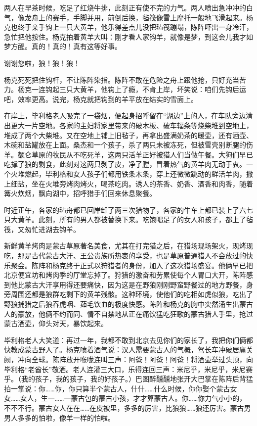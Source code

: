 \par 两人在早茶时候，吃足了红烧牛排，此刻正有使不完的力气。两人喷出急冲冲的白气，像龙舟上的赛手，手脚并用，前倒后换，毡筏像雪上摩托一般地飞滑起来。杨克也终于亲手钩上一只大黄羊，他乐得差点儿没把毡筏蹦塌，陈阵吓出一身冷汗，急忙把他按住。杨克拍着黄羊大叫：刚才看人家钩羊，就像是梦，到这会儿我才如梦方醒。真的！真的！真有这等好事。
\par 谢谢您啦，狼！狼！狼！
\par 杨克死死把住钩杆，不让陈阵染指。陈阵不敢在危险之舟上跟他抢，只好充当苦力。杨克一连钩起三只大黄羊，他钩上了瘾，不肯上岸，坏笑说：咱们先钩后运吧，效率更高。说完，杨克就把钩到的羊平放在结实的雪面上。
\par 在岸上，毕利格老人吸完了一袋烟，便起身招呼留在“湖边”上的人，在车队旁边清出更大一片空地。各家的主妇将家里带来的破木板、破车辐条等烧柴堆到空地上，堆成了两个大柴堆。又在空地上铺上旧毡子，再拿出盛满奶茶的暖壶，还有酒壶、木碗和盐罐放在上面。桑杰和一个孩子，杀了两只未被冻死，但被雪壳别断腿的伤羊。额仑草原的牧民从不吃死羊，这两只活羊正好被猎人们当做午餐。大狗们早已吃撑了狼的剩食，此刻对这两只剥了皮，净了膛，冒着热气的黄羊肉无动于衷。一个火堆燃起，毕利格和女人孩子们都用铁条木条，穿上还微微跳动的鲜活羊肉，撒上细盐，坐在火堆旁烤肉烤火，喝茶吃肉。诱人的茶香、奶香、酒香和肉香，随着篝火炊烟，飘向湖中，招呼猎手们回来休息聚餐。
\par 时近正午，各家的毡舟都已回岸卸了两三次猎物了，各家的牛车上都已装上了六七只大黄羊。此刻，所有的男人都被替换下来。吃饱喝足了的女人和孩子，都上了毡筏，又匆忙进湖去钩羊。
\par 新鲜黄羊烤肉是蒙古草原著名美食，尤其在打完猎之后，在猎场现场架火，现烤现吃，那是古代蒙古大汗、王公贵族所热衷的享受，也是草原普通猎人不会放过的快乐聚会。陈阵和杨克终于正式以狩猎者的身份，加入了这次猎场盛宴。他俩早已把北京便宜坊和烤肉季的厅堂忘掉了。狩猎的激奋和劳累使每个人胃口大开，陈阵感到他比蒙古大汗享用得还要痛快，因为这是在野狼刚刚野蛮野餐过的地方野餐，身旁周围还都是狼群吃剩下的黄羊残骸。这种环境，使他们的吃相如虎似狼，吃出了野狼捕猎之后狼吞虎咽、茹毛饮血的极度快感。陈阵和杨克的胸中突然涌生出蒙古人的豪放，他俩不约而同、情不自禁地从正在痛饮猛吃狂歌的蒙古猎人手里，抢过蒙古酒壶，仰头对天，暴饮起来。
\par 毕利格老人大笑道：再过一年，我都不敢到北京去见你们的家长了，我把你们俩都快教成蒙古野人了。杨克喷着酒气说：汉人需要蒙古人的气概，驾长车冲破居庸关阙，冲向全球。陈阵放开喉咙连叫三声：阿爸！阿爸！阿爸！将酒壶举过头顶，向毕利格“老酋长”敬酒。老人连灌三大口，乐得连回三声：米尼乎，米尼乎，米尼赛乎。（我的孩子，我的孩子，我的好孩子。）巴图醉醺醺地张开大巴掌在陈阵后背猛拍一掌说：你……你，你只算半个蒙古人，什什……什么时候，你你娶个蒙古女女……女人，生一……一蒙古包的蒙古小孩，才才算蒙古人。你……你力气小小的，不不不行。蒙古女人在在……在皮被里，多多的厉害，比狼狼……狼还厉害。蒙古男男人多多的怕啦，像羊一样的怕啦。
